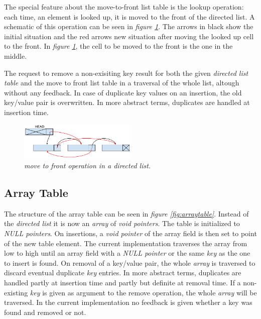 \documentclass[a4paper,11pt,twoside]{article}
\begin{document}
The special feature about the move-to-front list table is the lookup
operation: each time, an element is looked up, it is moved to the
front of the directed list. A schematic of this operation can be seen
in \textit{figure \ref{fig:movetofront}}. The arrows in black show the
initial situation and the red arrows new situation after moving the
looked up cell to the front. In \textit{figure \ref{fig:movetofront}},
the cell to be moved to the front is the one in the middle.

The request to remove a non-exisiting key result for both the given
\emph{directed list table} and the {move to front list table} in a traversal 
of the whole list, altough without any feedback. In case of duplicate
key values on an insertion, the old key/value pair is overwritten. In
more abstract terms, duplicates are handled at insertion time. 

\begin{figure}[H]
\centering
\includegraphics[width=0.5\textwidth]{figures/movetofront.pdf}
\caption{\textit{move to front operation in a directed list.}}
\label{fig:movetofront}
\end{figure}

\subsection{Array Table}
The structure of the {array table} can be seen in \textit{figure
  \ref{fig:arraytable}}. Instead of the \emph{directed list} it is now
an \emph{array} of \emph{void pointers}. The table is initialized to \emph{NULL
pointers}. On insertions, a \emph{void pointer} of the array field is then
set to point of the new table element. The current implementation
traverses the array from low to high until an array field with a \emph{NULL
pointer} or the same \emph{key} as the one to insert is found. On removal
of a key/value pair, the whole \emph{array} is traversed to discard eventual
duplicate \emph{key} entries. In more abstract terms, duplicates are handled
partly at insertion time and partly but definite at removal time. 
If a non-existing \emph{key} is given as argument to
the remove operation, the whole \emph{array} will be traversed. In the
current implementation no feedback is given whether a key was found
and removed or not.   
\end{document}
